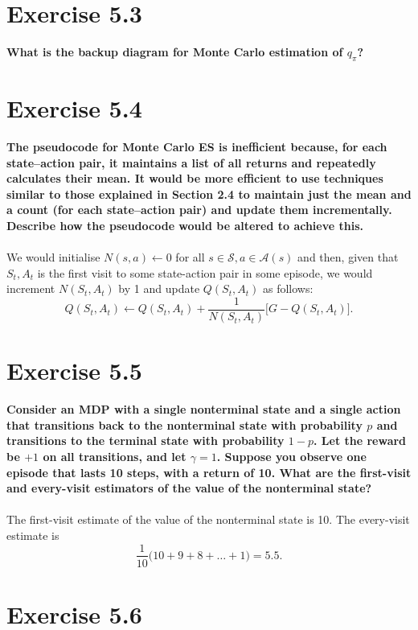 \documentclass[a4paper,11pt]{article}
\numberwithin{equation}{section}
\theoremstyle{remark}
\begin{document}
\section{Exercise 5.3}

\textbf{What is the backup diagram for Monte Carlo estimation of $q_\pi$?}

\section{Exercise 5.4}

\textbf{The pseudocode for Monte Carlo ES is inefficient because, for each state–action pair, it maintains a list of all returns and repeatedly calculates their mean. It would be more efficient to use techniques similar to those explained in Section 2.4 to maintain just the mean and a count (for each state–action pair) and update them incrementally. Describe how the pseudocode would be altered to achieve this.}
\\ \\
We would initialise $N(s, a) \gets 0$ for all $s \in \mathcal{S}, a \in \mathcal{A}(s)$ and then, given that $S_t, A_t$ is the first visit to some state-action pair in some episode, we would increment $N(S_t, A_t)$ by 1 and update $Q(S_t, A_t)$ as follows:
\[
	Q(S_t, A_t) \gets Q(S_t, A_t) + \frac{1}{N(S_t, A_t)} \Big[G - Q(S_t, A_t)\Big].
\]

\section{Exercise 5.5}

\textbf{Consider an MDP with a single nonterminal state and a single action that transitions back to the nonterminal state with probability $p$ and transitions to the terminal state with probability $1 - p$. Let the reward be $+1$ on all transitions, and let $\gamma = 1$. Suppose you observe one episode that lasts 10 steps, with a return of 10. What are the first-visit and every-visit estimators of the value of the nonterminal state?}
\\ \\
The first-visit estimate of the value of the nonterminal state is 10. The every-visit estimate is
\[
	\frac{1}{10}\Big(10 + 9 + 8 + \dots + 1\Big) =  5.5.
\]

\section{Exercise 5.6}
\end{document}
